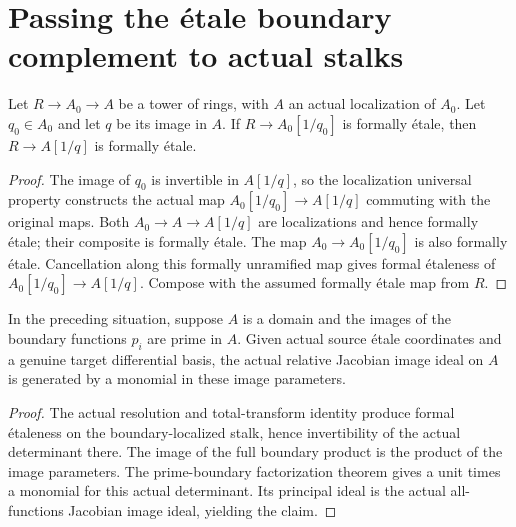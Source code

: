 \section{Passing the \'etale boundary complement to actual stalks}

\begin{lemma}\label{lem:sc0-localized-stalk-etale}
\leanok
Let $R\to A_0\to A$ be a tower of rings, with $A$ an actual localization of
$A_0$. Let $q_0\in A_0$ and let $q$ be its image in $A$. If $R\to A_0[1/q_0]$
is formally \'etale, then $R\to A[1/q]$ is formally \'etale.
\end{lemma}
\begin{proof}
The image of $q_0$ is invertible in $A[1/q]$, so the localization universal
property constructs the actual map $A_0[1/q_0]\to A[1/q]$ commuting with the
original maps. Both $A_0\to A\to A[1/q]$ are localizations and hence formally
\'etale; their composite is formally \'etale. The map $A_0\to A_0[1/q_0]$ is
also formally \'etale. Cancellation along this formally unramified map gives
formal \'etaleness of $A_0[1/q_0]\to A[1/q]$. Compose with the assumed formally
\'etale map from $R$.
\end{proof}

\begin{corollary}\label{cor:sc0-jacobian-localized-stalk-monomial}
\leanok
{}
In the preceding situation, suppose $A$ is a domain and the images of the boundary
functions $p_i$ are prime in $A$. Given actual source \'etale coordinates and a
genuine target differential basis, the actual relative Jacobian image ideal on
$A$ is generated by a monomial in these image parameters.
\end{corollary}
\begin{proof}
The actual resolution and total-transform identity produce formal \'etaleness on
the boundary-localized stalk, hence invertibility of the actual determinant there.
The image of the full boundary product is the product of the image parameters.
The prime-boundary factorization theorem gives a unit times a monomial for this
actual determinant. Its principal ideal is the actual all-functions Jacobian
image ideal, yielding the claim.
\end{proof}

